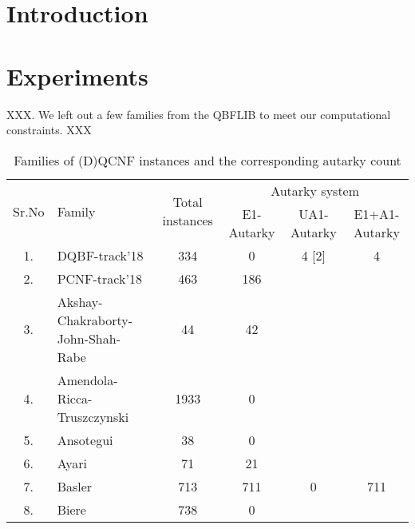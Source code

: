 \documentclass[runningheads]{llncs}
\begin{document}
\section{Introduction}
\label{sec:intro}



\section{Experiments}
\label{sec:experiments}

XXX.
We left out a few families from the QBFLIB to meet our computational constraints. XXX

\begin{table}
\caption{Families of (D)QCNF instances and the corresponding autarky count}\label{tab:aut-count}
\begin{tabular}{c|l|c|c|c|c}

\hline
   \multirow{2}{1cm}{Sr.No} &  \multirow{2}{3cm}{Family} &  \multirow{2}{2cm}{Total instances} & \multicolumn{3}{c}{Autarky system} \\
    \cline{4-6}
  & & & E1-Autarky & UA1-Autarky & E1+A1-Autarky \\
    
\hline

1. & DQBF-track'18 &  334 & 0 & 4 [2] & 4 \\ \hline
2. & PCNF-track'18 &  463 & 186 &  &  \\ \hline

3. & Akshay-Chakraborty-John-Shah-Rabe &  44 & 42 &  &  \\ \hline

4. & Amendola-Ricca-Truszczynski & 1933 & 0 &  &  \\ \hline

5. & Ansotegui &  38 & 0 &  &  \\ \hline

6. & Ayari &  71 & 21  &  &  \\ \hline

7. & Basler &  713 & 711 & 0 & 711 \\ \hline

8. & Biere &  738 & 0 &  &  \\ \hline


\end{tabular}
\end{table}
\end{document}
